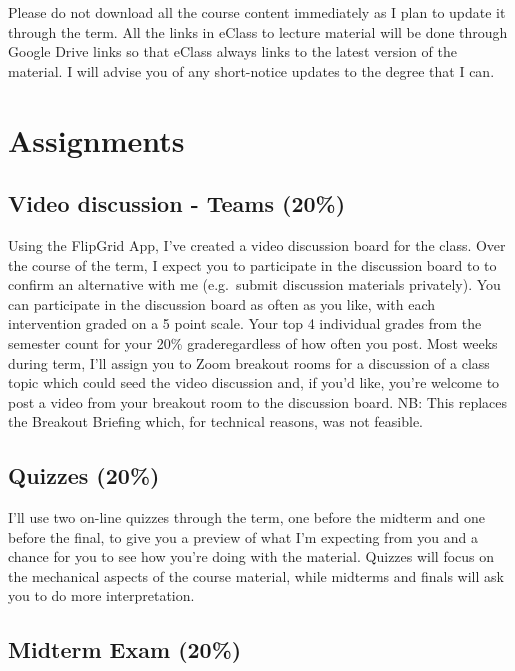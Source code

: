 \documentclass[11pt,]{article}
\begin{document}
Please do not download all the course content immediately as I plan to
update it through the term. All the links in eClass to lecture material
will be done through Google Drive links so that eClass always links to
the latest version of the material. I will advise you of any
short-notice updates to the degree that I can.

\hypertarget{assignments}{%
\section{Assignments}\label{assignments}}

\hypertarget{video-discussion---teams-20}{%
\subsection{Video discussion - Teams
(20\%)}\label{video-discussion---teams-20}}

Using the FlipGrid App, I've created a video discussion board for the
class. Over the course of the term, I expect you to participate in the
discussion board to to confirm an alternative with me (e.g.~submit
discussion materials privately). You can participate in the discussion
board as often as you like, with each intervention graded on a 5 point
scale. Your top 4 individual grades from the semester count for your
20\% graderegardless of how often you post. Most weeks during term, I'll
assign you to Zoom breakout rooms for a discussion of a class topic
which could seed the video discussion and, if you'd like, you're welcome
to post a video from your breakout room to the discussion board. NB:
This replaces the Breakout Briefing which, for technical reasons, was
not feasible.

\hypertarget{quizzes-20}{%
\subsection{Quizzes (20\%)}\label{quizzes-20}}

I'll use two on-line quizzes through the term, one before the midterm
and one before the final, to give you a preview of what I'm expecting
from you and a chance for you to see how you're doing with the material.
Quizzes will focus on the mechanical aspects of the course material,
while midterms and finals will ask you to do more interpretation.

\hypertarget{midterm-exam-20}{%
\subsection{Midterm Exam (20\%)}\label{midterm-exam-20}}
\end{document}
